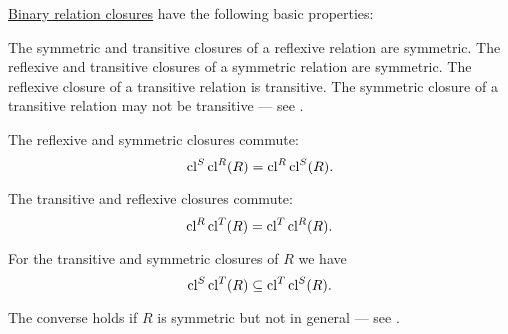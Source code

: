\begin{proposition}\label{thm:def:relation_closures/properties}
  \hyperref[def:relation_closures]{Binary relation closures} have the following basic properties:
  \begin{thmenum}
     The symmetric and transitive closures of a reflexive relation are symmetric.
     The reflexive and transitive closures of a symmetric relation are symmetric.
     The reflexive closure of a transitive relation is transitive. The symmetric closure of a transitive relation may not be transitive --- see .

     The reflexive and symmetric closures commute:
    \begin{equation}\label{eq:thm:def:relation_closures/properties/reflexive_and_symmetric}
      \operatorname{cl}^S \operatorname{cl}^R(R) = \operatorname{cl}^R \operatorname{cl}^S(R).
    \end{equation}

     The transitive and reflexive closures commute:
    \begin{equation}\label{eq:thm:def:relation_closures/properties/reflexive_and_transitive}
      \operatorname{cl}^R \operatorname{cl}^T(R) = \operatorname{cl}^T \operatorname{cl}^R(R).
    \end{equation}

     For the transitive and symmetric closures of \( R \) we have
    \begin{equation}\label{eq:thm:def:relation_closures/properties/symmetric_and_transitive}
      \operatorname{cl}^S \operatorname{cl}^T(R) \subseteq \operatorname{cl}^T \operatorname{cl}^S(R).
    \end{equation}

    The converse holds if \( R \) is symmetric but not in general --- see .
  \end{thmenum}
\end{proposition}
